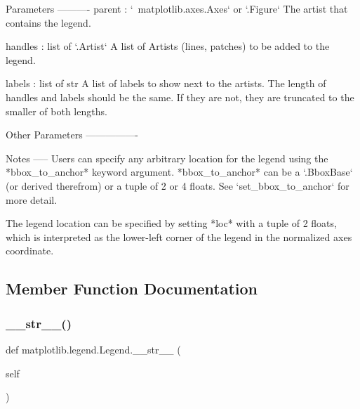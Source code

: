\begin{DoxyVerb}Parameters
----------
parent : `~matplotlib.axes.Axes` or `.Figure`
    The artist that contains the legend.

handles : list of `.Artist`
    A list of Artists (lines, patches) to be added to the legend.

labels : list of str
    A list of labels to show next to the artists. The length of handles
    and labels should be the same. If they are not, they are truncated
    to the smaller of both lengths.

Other Parameters
----------------

Notes
-----
Users can specify any arbitrary location for the legend using the
*bbox_to_anchor* keyword argument. *bbox_to_anchor* can be a
`.BboxBase` (or derived therefrom) or a tuple of 2 or 4 floats.
See `set_bbox_to_anchor` for more detail.

The legend location can be specified by setting *loc* with a tuple of
2 floats, which is interpreted as the lower-left corner of the legend
in the normalized axes coordinate.
\end{DoxyVerb}
 

\subsection{Member Function Documentation}
\mbox{\label{classmatplotlib_1_1legend_1_1Legend_aaae5d20edebb2756b86699ace4fd86ef}} 
\subsubsection{\texorpdfstring{\+\_\+\+\_\+str\+\_\+\+\_\+()}{\_\_str\_\_()}}
{\footnotesize\ttfamily def matplotlib.\+legend.\+Legend.\+\_\+\+\_\+str\+\_\+\+\_\+ (\begin{DoxyParamCaption}\item[{}]{self }\end{DoxyParamCaption})}

\mbox{\label{classmatplotlib_1_1legend_1_1Legend_a35fad0b6855abfd835e02af5cddf25a7}} 
